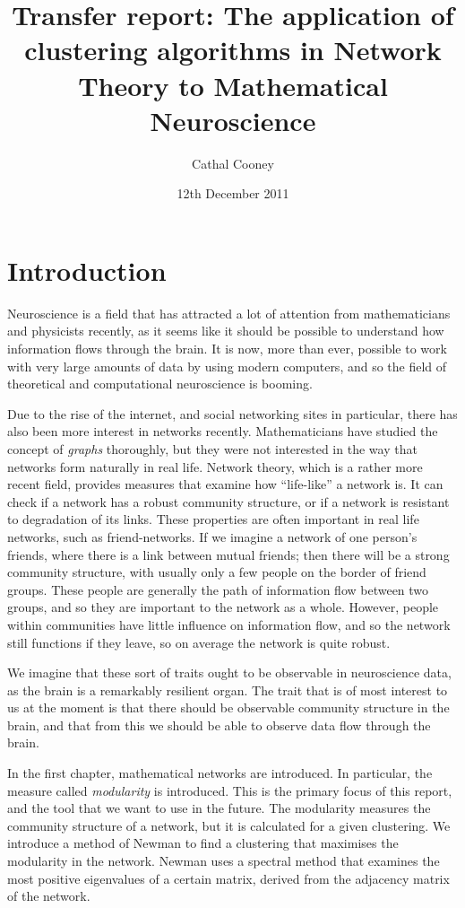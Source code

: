 \documentclass[a4paper,12pt]{report}
\begin{document}
\title{Transfer report:  The application of clustering algorithms in Network Theory to Mathematical Neuroscience}
\date{12th December 2011}
\author{Cathal Cooney}
\maketitle

\chapter{Introduction}
Neuroscience is a field that has attracted a lot of attention from 
mathematicians and physicists recently, as it seems like it should be possible 
to understand how information flows through the brain.  It is now, more than 
ever, possible to work with very large amounts of data by using modern 
computers, and so the field of theoretical and computational neuroscience is 
booming.

Due to the rise of the internet, and social networking sites in particular, 
there has also been more interest in networks recently.  Mathematicians have 
studied the concept of {\sl graphs} thoroughly, but they were not interested in 
the way that networks form naturally in real life.  Network theory, which is a 
rather more recent field, provides measures that examine how ``life-like'' a 
network is.  It can check if a network has a robust community structure, or if 
a network is resistant to degradation of its links.  These properties are often important in real life networks, such as friend-networks. If we imagine a network of one person's friends, where there is a link between mutual friends; then there will be a strong community structure, with usually only a few people on the border of friend groups.  These people are generally the path of information flow between two groups, and so they are important to the network as a whole. However, people within communities have little influence on information flow, and so the network still functions if they leave, so on average the network is quite robust.

We imagine that these sort of traits ought to be observable in neuroscience 
data, as the brain is a remarkably resilient organ.  The trait that is of most 
interest to us at the moment is that there should be observable community 
structure in the brain, and that from this we should be able to observe data 
flow through the brain.

In the first chapter, mathematical networks are introduced.  In particular, the 
measure called {\sl modularity} is introduced.  This is the primary focus of 
this report, and the tool that we want to use in the future.  The modularity 
measures the community structure of a network, but it is calculated for a given 
clustering.  We introduce a method of Newman \cite{Newman2006a} to find a 
clustering that maximises the modularity in the network.  Newman uses a 
spectral method that examines the most positive eigenvalues of a certain 
matrix, derived from the adjacency matrix of the network.
\end{document}

